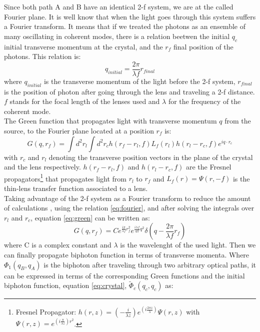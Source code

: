 Since both path A and B have an identical 2-f system, we are at the called Fourier plane. It is 
well know that when the light goes through this system suffers a Fourier transform\cite{introquantumoptics}. It means that if 
we treated the photons as an ensemble of many oscillating in coherent modes, there is a relation beetwen
the initial $q_c$ initial transverse momentum at the crystal, and the $r_f$ final position of 
the photons. This relation is:
\begin{equation}\label{eq:fourier}
q_{initial}=\frac{2 \pi}{\lambda f} r_{final}
\end{equation}
where $q_{initial}$ is the transverse momentum of the light before the 2-f system, $r_{final}$ is the position of photon
after going through the lens and traveling a 2-f distance. $f$ stands for the focal length of the lenses used and $\lambda$ for the frequency of the coherent mode.\\
The Green function that propagates light with transverse momentum $q$ from the source, to the
Fourier plane located at a position $r_f$ is\cite{green}:
\begin{equation}\label{eq:green}
G(q,r_f) = \int d^2 r_l \int d^2 r_c h(r_f - r_l,f) L_f(r_l) h(r_l - r_c,f) e^{i q \cdot r_c}
\end{equation}
with $r_c$ and $r_l$ denoting the transverse position vectors in the plane of the crystal and the 
lens respectively. $h(r_f - r_l,f)$ and $h(r_l - r_c,f)$ are the Fresnel propagators\footnote{Fresnel Propagator: $h(r,z)=(- \frac{i}{\lambda z})e^{(i \frac{2 \pi z}{\lambda})} \Psi (r,z)$ 
with $\Psi(r,z) = e^{(i \frac{\pi}{\lambda z })r^2}$. } that propagates light from $r_l$ to $r_f$ and 
$L_f (r)=\Psi(r,-f)$ is the thin-lens transfer function associated to a lens\cite{green}.
 \\
Taking advantage of the 2-f system as a Fourier transform to reduce the amount of calculations
, using the relation \ref{eq:fourier}, and after solving the integrals over $r_l$ and $r_c$, equation
 \ref{eq:green} can be written as:
\begin{equation}
\label{eq:greenSolve}
G(q,r_f)=C e^{\frac{i \pi}{\lambda f} r_f^2} e^{\frac{i \lambda f}{4 \pi} q^2} \delta ( q - \frac{2 \pi}{\lambda f}r_f)
\end{equation}
where C is a complex constant and $\lambda $ is the wavelenght of the used light.
Then we can finally propagate  biphoton function
in terms of transverse momenta. Where $\Phi_1 (q_B , q_A )$ is the biphoton after traveling
through two arbitrary optical paths, it can be expressed
in terms of the corresponding Green functions and the
initial biphoton function, equation \ref{eq:crystal}, $\tilde{\Phi}_c(q_c,q_c)$ as:

